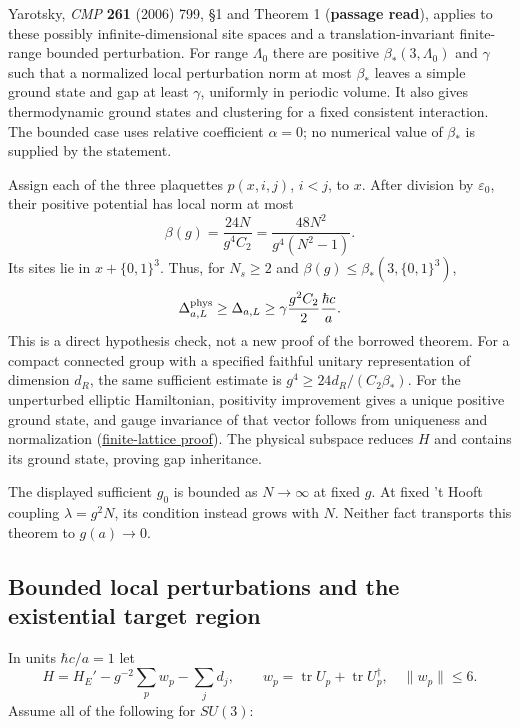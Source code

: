 \documentclass[11pt,a4paper]{article}
\begin{document}
Yarotsky, \emph{CMP} \textbf{261} (2006) 799, §1 and Theorem 1
(\textbf{passage read}), applies to these possibly infinite-dimensional
site spaces and a translation-invariant finite-range bounded
perturbation. For range \(\Lambda_0\) there are positive
\(\beta_*(3,\Lambda_0)\) and \(\gamma\) such that a normalized local
perturbation norm at most \(\beta_*\) leaves a simple ground state and
gap at least \(\gamma\), uniformly in periodic volume. It also gives
thermodynamic ground states and clustering for a fixed consistent
interaction. The bounded case uses relative coefficient \(\alpha=0\); no
numerical value of \(\beta_*\) is supplied by the statement.

Assign each of the three plaquettes \(p(x,i,j)\), \(i<j\), to \(x\).
After division by \(\varepsilon_0\), their positive potential has local
norm at most \[\beta(g)=\frac{24N}{g^4C_2}
 =\frac{48N^2}{g^4(N^2-1)}.\] Its sites lie in \(x+\{0,1\}^3\). Thus,
for \(N_s\ge2\) and \(\beta(g)\le\beta_*(3,\{0,1\}^3)\),
\[\Delta^{\rm phys}_{a,L}\ge\Delta_{a,L}
 \ge\gamma\frac{g^2C_2}{2}\frac{\hbar c}{a}.\] This is a direct
hypothesis check, not a new proof of the borrowed theorem. For a compact
connected group with a specified faithful unitary representation of
dimension \(d_R\), the same sufficient estimate is
\(g^4\ge24d_R/(C_2\beta_*)\). For the unperturbed elliptic Hamiltonian,
positivity improvement gives a unique positive ground state, and gauge
invariance of that vector follows from uniqueness and normalization
(\href{mass-gap-obligations-lattice.md}{finite-lattice proof}). The
physical subspace reduces \(H\) and contains its ground state, proving
gap inheritance.

The displayed sufficient \(g_0\) is bounded as \(N\to\infty\) at fixed
\(g\). At fixed 't Hooft coupling \(\lambda=g^2N\), its condition
instead grows with \(N\). Neither fact transports this theorem to
\(g(a)\to0\).

\hypertarget{bounded-local-perturbations-and-the-existential-target-region}{%
\subsection{Bounded local perturbations and the existential target
region}\label{bounded-local-perturbations-and-the-existential-target-region}}

In units \(\hbar c/a=1\) let \[H=H_E'-g^{-2}\sum_pw_p-\sum_jd_j,\qquad
 w_p=\operatorname{tr}U_p+\operatorname{tr}U_p^\dagger,\quad \|w_p\|\le6.\]
Assume all of the following for \(SU(3)\):
\end{document}
